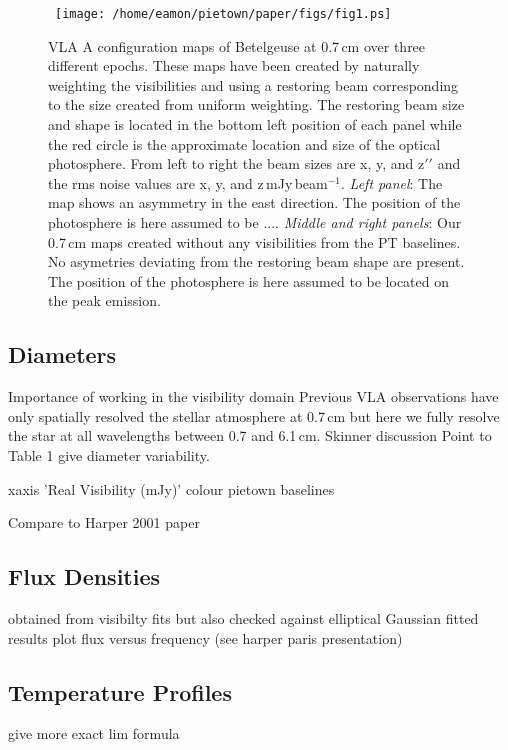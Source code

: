\documentclass[iop]{emulateapj}
\begin{document}
\begin{figure*}
\mbox{
\texttt{[image: /home/eamon/pietown/paper/figs/fig1.ps]}
}
\caption{VLA A configuration maps of Betelgeuse at 0.7\,cm over three different epochs. These maps have been created by naturally weighting the visibilities and using a restoring beam corresponding to the size created from uniform weighting. The restoring beam size and shape is located in the bottom left position of each panel while the red circle is the approximate location and size of the optical photosphere. From left to right the beam sizes are x, y, and z$\prime\prime$ and the rms noise values are x, y, and z\,mJy\,beam$^{-1}$. \textit{Left panel}: The \cite{lim_1998} map shows an asymmetry in the east direction. The position of the photosphere is here assumed to be .... \textit{Middle and right panels}: Our 0.7\,cm maps created without any visibilities from the PT baselines. No asymetries deviating from the restoring beam shape are present. The position of the photosphere is here assumed to be located on the peak emission.}
\label{fig1}
\end{figure*}

\subsection{Diameters} 
Importance of working in the visibility domain
Previous VLA observations have only spatially resolved the stellar atmosphere at 0.7\,cm but here we fully resolve the star at all wavelengths between 0.7 and 6.1\,cm. Skinner discussion
Point to Table 1 give diameter variability.

xaxis 'Real Visibility (mJy)' colour pietown baselines

Compare to Harper 2001 paper


\subsection{Flux Densities}
obtained from visibilty fits but also checked against elliptical Gaussian fitted results
plot flux versus frequency (see harper paris presentation)
\subsection{Temperature Profiles}
give more exact lim formula 
\end{document}
